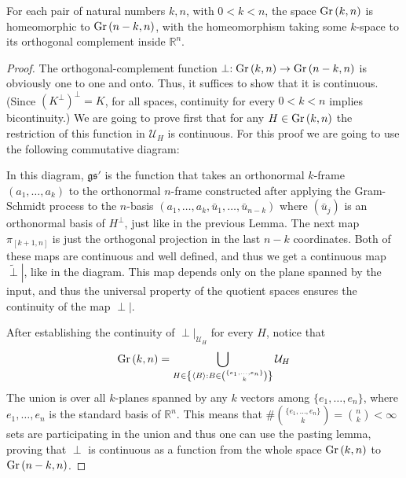 \begin{lemma} For each pair of natural numbers $k,n$, with $0<k<n$, the space $\Gr{k}{n}$ is homeomorphic to $\Gr{n-k}{n}$, with the homeomorphism taking some $k$-space to its orthogonal complement inside $\mathbb{R}^n$.
\end{lemma}

\begin{proof} The orthogonal-complement function $\perp:\Gr{k}{n}\to\Gr{n-k}{n}$ is obviously one to one and onto. Thus, it suffices to show that it is continuous. (Since ${\left(K^{\perp}\right)}^{\perp}=K$, for all spaces, continuity for every $0<k<n$ implies bicontinuity.) We are going to prove first that for any $H\in\Gr{k}{n}$ the restriction of this function in $\mathcal{U}_H$ is continuous. For this proof we are going to use the following commutative diagram:
\begin{center}
\end{center}
In this diagram, $\mathfrak{gs}'$ is the function that takes an orthonormal $k$-frame $(a_1,\ldots,a_k)$ to the orthonormal $n$-frame constructed after applying the Gram-Schmidt process to the $n$-basis $\left(a_1,\ldots,a_k,\bar{u}_1,\ldots,\bar{u}_{n-k}\right)$ where $\left(\bar{u}_j\right)$ is an orthonormal basis of $H^{\perp}$, just like in the previous Lemma. The next map $\pi_{[k+1,n]}$ is just the orthogonal projection in the last $n-k$ coordinates. Both of these maps are continuous and well defined, and thus we get a continuous map $\left.\tilde{\perp}\right|$, like in the diagram. This map depends only on the plane spanned by the input, and thus the universal property of the quotient spaces ensures the continuity of the map $\left.\perp\right|$.

After establishing the continuity of $\left.\perp\right|_{\mathcal{U}_H}$ for every $H$, notice that
\[\Gr{k}{n} = \bigcup_{H\in\left\{\left<B\right>:B\in\binom{\{e_1,\ldots,e_n\}}{k}\right\}}\mathcal{U}_H\]
The union is over all $k$-planes spanned by any $k$ vectors among $\{e_1,\ldots,e_n\}$, where $e_1,\ldots,e_n$ is the standard basis of $\mathbb{R}^n$. This means that $\#\binom{\{e_1,\ldots,e_n\}}{k}=\binom{n}{k}<\infty$ sets are participating in the union and thus one can use the pasting lemma, proving that $\perp$ is continuous as a function from the whole space $\Gr{k}{n}$ to $\Gr{n-k}{n}$.
\end{proof} 

